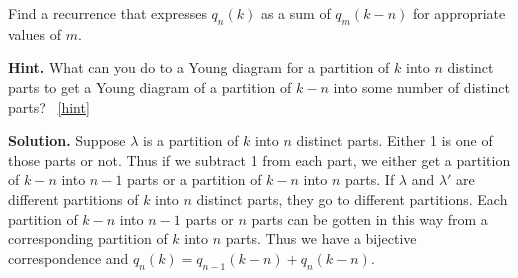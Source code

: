 \documentclass{book}
\begin{document}
\setcounter{project}{313}
\addtocounter{project}{-1}
\begin{activity}[]\label{activity-306}
\hypertarget{p-1564}{}%
Find a recurrence that expresses \(q_n(k)\) as a sum of \(q_m(k-n)\) for appropriate values of \(m\).%
\par\smallskip%
\noindent\textbf{Hint.}\hypertarget{hint-201}{}\quad%
\hypertarget{p-1565}{}%
What can you do to a Young diagram for a partition of \(k\) into \(n\) distinct parts to get a Young diagram of a partition of \(k-n\) into some number of distinct parts?%
~\hfill{\tiny\hyperlink{a-313}{[hint]}\hypertarget{q-313}{}}\par\smallskip%
\noindent\textbf{Solution.}\hypertarget{solution-206}{}\quad%
\hypertarget{p-1566}{}%
Suppose \(\lambda\) is a partition of \(k\) into \(n\) distinct parts. Either 1 is one of those parts or not. Thus if we subtract 1 from each part, we either get a partition of \(k-n\) into \(n-1\) parts or a partition of \(k-n\) into \(n\) parts. If \(\lambda\) and \(\lambda'\) are different partitions of \(k\) into \(n\) distinct parts, they go to different partitions. Each partition of \(k-n\) into \(n-1\) parts or \(n\) parts can be gotten in this way from a corresponding partition of \(k\) into \(n\) parts. Thus we have a bijective correspondence and \(q_n(k)=q_{n-1}(k-n) + q_{n}(k-n)\).%
\end{activity}

\clearpage
\end{document}

